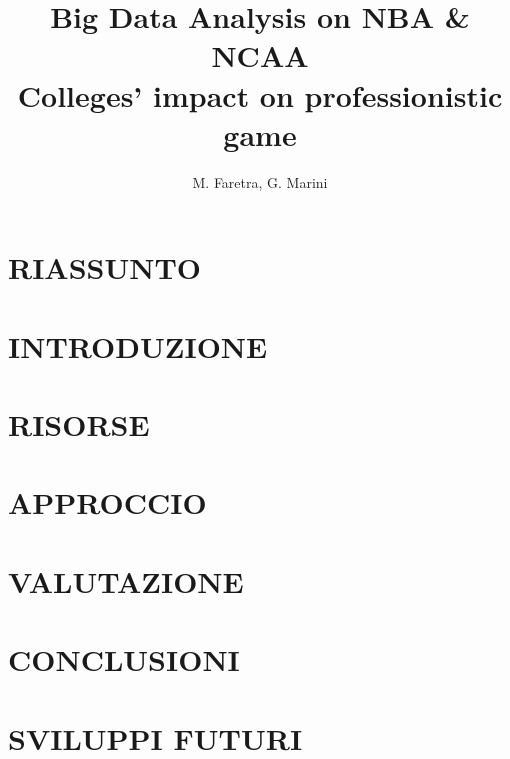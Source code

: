 \documentclass[10pt,a4paper]{article}
\author{M. Faretra, G. Marini}
\title{\textbf{Big Data Analysis on NBA \& NCAA}\\Colleges' impact on professionistic game}
\begin{document}
	
\maketitle
\thispagestyle{empty}
\pagestyle{empty}
		
\section*{RIASSUNTO}

\section{INTRODUZIONE} 

\section{RISORSE}
\section{APPROCCIO}
\section{VALUTAZIONE}

\section{CONCLUSIONI}

\section{SVILUPPI FUTURI}
\end{document}
